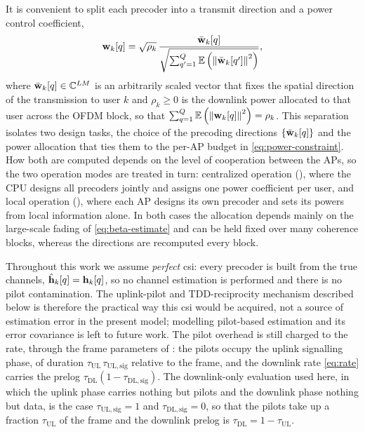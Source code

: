 It is convenient to split each precoder into a transmit direction and a power
control coefficient,
\begin{equation}
\label{eq:precoder-decomposition}
\boldsymbol{\mathrm{w}}_{k}[q] = \sqrt{\rho_{k}}\,
\frac{\bar{\boldsymbol{\mathrm{w}}}_{k}[q]}
{\sqrt{\sum_{q'=1}^{Q}\mathbb{E}\left(\left\lVert\bar{\boldsymbol{\mathrm{w}}}_{k}[q']\right\rVert^{2}\right)}},
\end{equation}
where $\bar{\boldsymbol{\mathrm{w}}}_{k}[q]\in\mathbb{C}^{LM}$ is an arbitrarily scaled vector that fixes
the spatial direction of the transmission to user $k$ and $\rho_{k}\geq 0$ is the
downlink power allocated to that user across the OFDM block, so that
$\sum_{q=1}^{Q}\mathbb{E}\left(\left\lVert\boldsymbol{\mathrm{w}}_{k}[q]\right\rVert^{2}\right)=\rho_{k}$. This separation isolates two design
tasks, the choice of the precoding directions $\{\bar{\boldsymbol{\mathrm{w}}}_{k}[q]\}$ and the
power allocation that ties them to the per-AP budget in
\eqref{eq:power-constraint}. How both are computed depends on the level of
cooperation between the APs, so the two operation modes are treated in turn:
centralized operation (), where the CPU designs all
precoders jointly and assigns one power coefficient per user, and local
operation (), where each AP designs its own precoder and sets
its powers from local information alone. In both cases the allocation depends
mainly on the large-scale fading of \eqref{eq:beta-estimate} and can be held
fixed over many coherence blocks, whereas the directions are recomputed every
block.

Throughout this work we assume \emph{perfect} \gls{csi}: every precoder is built
from the true channels, $\hat{\boldsymbol{\mathrm{h}}}_{k}[q]=\boldsymbol{\mathrm{h}}_{k}[q]$, so no channel
estimation is performed and there is no pilot contamination. The uplink-pilot and
TDD-reciprocity mechanism described below is therefore the practical way this
\gls{csi} would be acquired, not a source of estimation error in the present
model; modelling pilot-based estimation and its error covariance is left to
future work. The pilot overhead is still charged to the rate, through the frame
parameters of : the pilots occupy the uplink signalling phase, of
duration $\tau_{\mathrm{UL}}\,\tau_{\mathrm{UL,sig}}$ relative to the frame, and
the downlink rate \eqref{eq:rate} carries the prelog
$\tau_{\mathrm{DL}}(1-\tau_{\mathrm{DL,sig}})$. The downlink-only evaluation used
here, in which the uplink phase carries nothing but pilots and the downlink phase
nothing but data, is the case $\tau_{\mathrm{UL,sig}}=1$ and
$\tau_{\mathrm{DL,sig}}=0$, so that the pilots take up a fraction
$\tau_{\mathrm{UL}}$ of the frame and the downlink prelog is
$\tau_{\mathrm{DL}}=1-\tau_{\mathrm{UL}}$.



